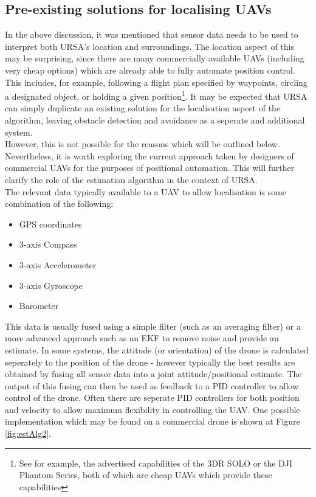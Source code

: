 \documentclass[capstone_report.tex]{subfiles}
\begin{document}
\subsection{Pre-existing solutions for localising UAVs}
In the above discussion, it was mentioned that sensor data needs to be used to interpret both URSA's location and surroundings. The location aspect of this may be surprising, since there are many commercially available UAVs (including very cheap options) which are already able to fully automate position control. This includes, for example, following a flight plan specified by waypoints, circling a designated object, or holding a given position\footnote{See for example, the advertised capabilities of the 3DR SOLO or the DJI Phantom Series, both of which are cheap UAVs which provide these capabilities}. It may be expected that URSA can simply duplicate an existing solution for the localisation aspect of the algorithm, leaving obstacle detection and avoidance as a seperate and additional system.\\

However, this is not possible for the reasons which will be outlined below. Nevertheless, it is worth exploring the current approach taken by designers of commercial UAVs for the purposes of positional automation. This will further clarify the role of the estimation algorithm in the context of URSA.\\

The relevant data typically available to a UAV to allow localisation is some combination of the following:
\begin{itemize}
	\item GPS coordinates
	\item 3-axis Compass
	\item 3-axis Accelerometer
	\item 3-axis Gyroscope
	\item Barometer
\end{itemize}

This data is usually fused using a simple filter (such as an averaging filter) or a more advanced approach such as an EKF to remove noise and provide an estimate. In some systems, the attitude (or orientation) of the drone is calculated seperately to the position of the drone - however typically the best results are obtained by fusing all sensor data into a joint attitude/positional estimate. The output of this fusing can then be used as feedback to a PID controller to allow control of the drone. Often there are seperate PID controllers for both position and velocity to allow maximum flexibility in controlling the UAV. One possible implementation which may be found on a commercial drone is shown at Figure \ref{fig:estAlg2}. \\
\end{document}
